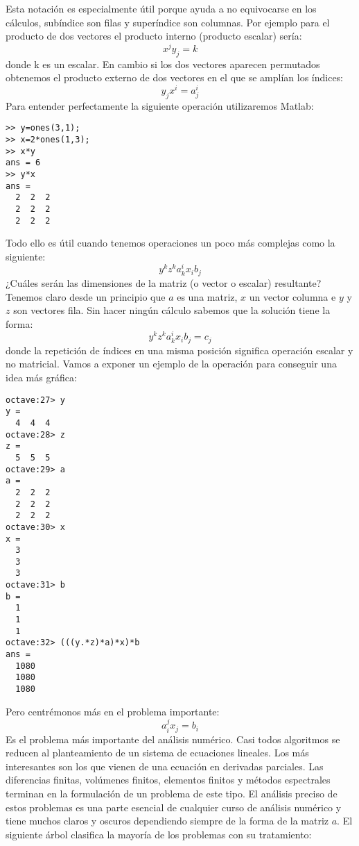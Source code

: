 Esta notación es especialmente útil porque ayuda a no equivocarse
en los cálculos, subíndice son filas y superíndice son columnas. Por
ejemplo para el producto de dos vectores el producto interno (producto
escalar) sería:
$$x^{j}y_{j}=k$$
donde k es un escalar. En cambio si los dos vectores aparecen permutados
obtenemos el producto externo de dos vectores en el que se amplían
los índices:
$$y_{j}x^{i}=a_{j}^{i}$$
Para entender perfectamente la siguiente operación utilizaremos Matlab:

  \begin{verbatim}
>> y=ones(3,1);
>> x=2*ones(1,3);
>> x*y
ans = 6
>> y*x
ans =
  2  2  2
  2  2  2
  2  2  2
 \end{verbatim}
Todo ello es útil cuando tenemos operaciones un poco más complejas
como la siguiente:
$$y^{k}z^{k}a_{k}^{i}x_{i}b_{j}$$
¿Cuáles serán las dimensiones de la matriz (o vector o escalar) resultante?
Tenemos claro desde un principio que $a$ es una matriz, $x$ un vector
columna e $y$ y $z$ son vectores fila. Sin hacer ningún cálculo
sabemos que la solución tiene la forma:
$$y^{k}z^{k}a_{k}^{i}x_{i}b_{j}=c_{j}$$
donde la repetición de índices en una misma posición significa operación
escalar y no matricial. Vamos a exponer un ejemplo de la operación
para conseguir una idea más gráfica:

  \begin{verbatim}
octave:27> y
y =
  4  4  4
octave:28> z
z =
  5  5  5
octave:29> a
a =
  2  2  2
  2  2  2
  2  2  2
octave:30> x
x =
  3
  3
  3
octave:31> b
b =
  1
  1
  1
octave:32> (((y.*z)*a)*x)*b
ans =
  1080
  1080
  1080
 \end{verbatim}
Pero centrémonos más en el problema importante:
$$a_{i}^{j}x_{j}=b_{i}$$
Es el problema más importante del análisis numérico. Casi todos algoritmos
se reducen al planteamiento de un sistema de ecuaciones lineales.
Los más interesantes son los que vienen de una ecuación en derivadas
parciales. Las diferencias finitas, volúmenes finitos, elementos finitos
y métodos espectrales terminan en la formulación de un problema de
este tipo. El análisis preciso de estos problemas es una parte esencial
de cualquier curso de análisis numérico y tiene muchos claros y oscuros
dependiendo siempre de la forma de la matriz $a$. El siguiente árbol
clasifica la mayoría de los problemas con su tratamiento:

